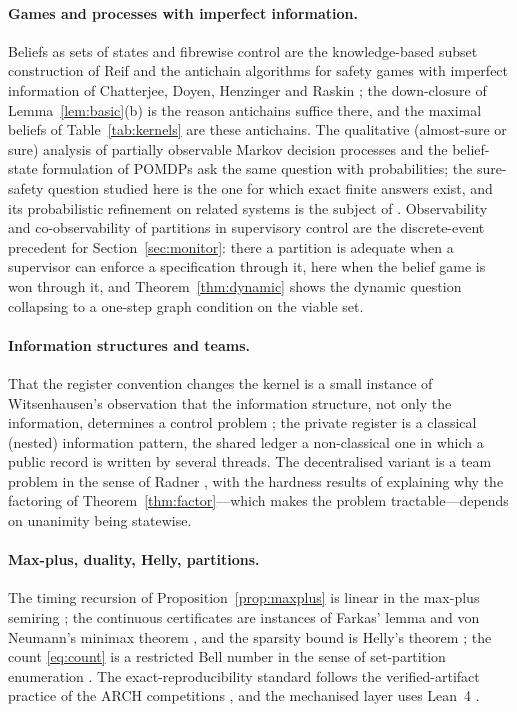 \documentclass[11pt,a4paper]{article}
\theoremstyle{plain}
\theoremstyle{definition}
\theoremstyle{remark}
\begin{document}
\paragraph{Games and processes with imperfect information.}
Beliefs as sets of states and fibrewise control are the knowledge-based subset construction of Reif \cite{Reif1984} and the antichain algorithms for safety games with imperfect information of Chatterjee, Doyen, Henzinger and Raskin \cite{CDHR2007}; the down-closure of Lemma~\ref{lem:basic}(b) is the reason antichains suffice there, and the maximal beliefs of Table~\ref{tab:kernels} are these antichains. The qualitative (almost-sure or sure) analysis of partially observable Markov decision processes \cite{CDH2010} and the belief-state formulation of POMDPs \cite{SmallwoodSondik1973,Kaelbling1998} ask the same question with probabilities; the sure-safety question studied here is the one for which exact finite answers exist, and its probabilistic refinement on related systems is the subject of \cite{Abaee2026prob}. Observability and co-observability of partitions in supervisory control \cite{LinWonham1988,CassandrasLafortune2008} are the discrete-event precedent for Section~\ref{sec:monitor}: there a partition is adequate when a supervisor can enforce a specification through it, here when the belief game is won through it, and Theorem~\ref{thm:dynamic} shows the dynamic question collapsing to a one-step graph condition on the viable set.

\paragraph{Information structures and teams.}
That the register convention changes the kernel is a small instance of Witsenhausen's observation that the information structure, not only the information, determines a control problem \cite{Witsenhausen1971,Ho1980}; the private register is a classical (nested) information pattern, the shared ledger a non-classical one in which a public record is written by several threads. The decentralised variant is a team problem in the sense of Radner \cite{Radner1962}, with the hardness results of \cite{TsitsiklisAthans1985,Bernstein2002} explaining why the factoring of Theorem~\ref{thm:factor}---which makes the problem tractable---depends on unanimity being statewise.

\paragraph{Max-plus, duality, Helly, partitions.}
The timing recursion of Proposition~\ref{prop:maxplus} is linear in the max-plus semiring \cite{Baccelli1992,Heidergott2006}; the continuous certificates are instances of Farkas' lemma and von Neumann's minimax theorem \cite{Farkas1902,vonNeumann1928}, and the sparsity bound is Helly's theorem \cite{Helly1923,DanzerGrunbaumKlee1963}; the count \eqref{eq:count} is a restricted Bell number in the sense of set-partition enumeration \cite{Stanley2012}. The exact-reproducibility standard follows the verified-artifact practice of the ARCH competitions \cite{Althoff2020,Geretti2020}, and the mechanised layer uses Lean~4 \cite{MouraUllrich2021}.
\end{document}
